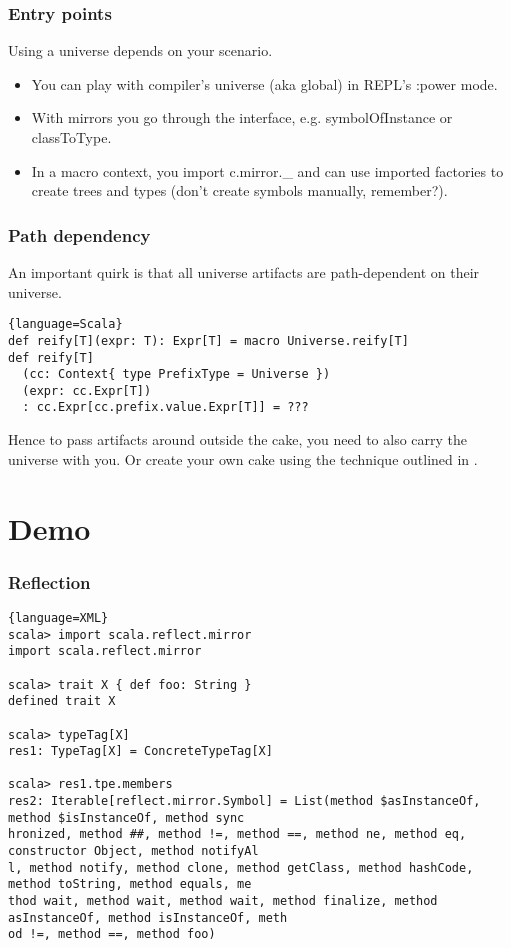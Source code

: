 \documentclass[hyperref={bookmarks=false}]{beamer}
\begin{document}
\begin{frame}[fragile]
\frametitle{Entry points}

Using a universe depends on your scenario.

\begin{itemize}
\item You can play with compiler's universe (aka global) in REPL's :power mode.
\item With mirrors you go through the 
interface, e.g. symbolOfInstance or classToType.
\item In a macro context, you import c.mirror.\_ and can use imported factories to create trees and types (don't create symbols manually, remember?).
\end{itemize}
\end{frame}

\begin{frame}[fragile]
\frametitle{Path dependency}

An important quirk is that all universe artifacts are path-dependent on their universe.

\begin{lstlisting}{language=Scala}
def reify[T](expr: T): Expr[T] = macro Universe.reify[T]
def reify[T]
  (cc: Context{ type PrefixType = Universe })
  (expr: cc.Expr[T])
  : cc.Expr[cc.prefix.value.Expr[T]] = ???
\end{lstlisting}

Hence to pass artifacts around outside the cake, you need to also carry the universe with you.
Or create your own cake using the technique outlined in
.
\end{frame}

\section{Demo}

\begin{frame}[fragile]
\frametitle{Reflection}

\begin{lstlisting}{language=XML}
scala> import scala.reflect.mirror
import scala.reflect.mirror

scala> trait X { def foo: String }
defined trait X

scala> typeTag[X]
res1: TypeTag[X] = ConcreteTypeTag[X]

scala> res1.tpe.members
res2: Iterable[reflect.mirror.Symbol] = List(method $asInstanceOf, method $isInstanceOf, method sync
hronized, method ##, method !=, method ==, method ne, method eq, constructor Object, method notifyAl
l, method notify, method clone, method getClass, method hashCode, method toString, method equals, me
thod wait, method wait, method wait, method finalize, method asInstanceOf, method isInstanceOf, meth
od !=, method ==, method foo)
\end{lstlisting}
\end{frame}
\end{document}
